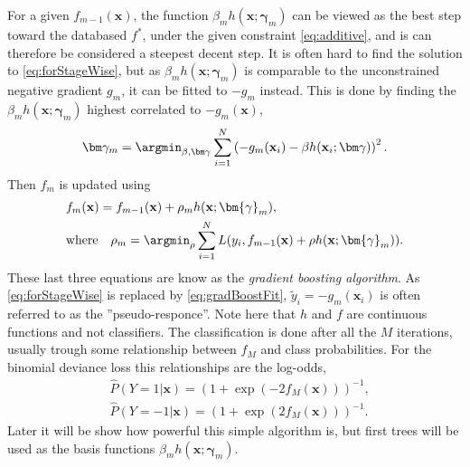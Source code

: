 For a given $f_{m-1}(\mathbf{x})$, the function $\beta_m h(\mathbf{x}; \bm{\gamma}_m)$ can be viewed as the best step toward the databased $f^*$, under the given constraint \eqref{eq:additive}, and is can therefore be considered a steepest decent step. It is often hard to find the solution to \eqref{eq:forStageWise}, but as $\beta_m h(\mathbf{x}; \bm{\gamma}_m)$ is comparable to the unconstrained negative gradient $g_m$, it can be fitted to $-g_m$ instead. This is done by finding the $\beta_m h(\mathbf{x}; \bm{\gamma}_m)$ highest correlated to $-g_m(\mathbf{x})$,
\begin{align}
  \label{eq:gradBoostFit} 
  \bm \gamma_m = \argmin_{\beta, \bm \gamma} \sum^{N}_{i=1} \left( -g_m(\mathbf{x}_i) - \beta h(\mathbf{x}_i; \bm \gamma) \right)^2.
\end{align}
Then $f_m$ is updated using
\begin{align}
  &f_m(\mathbf{x}) = f_{m-1}(\mathbf{x}) + \rho_m h(\mathbf{x}; \bm{\gamma}_{m}),\\
  \label{eq:lineSearch} 
  &\text{where} \quad \rho_m = \argmin_\rho \sum^{N}_{i=1} L(y_i, f_{m-1}(\mathbf{x}) + \rho h(\mathbf{x}; \bm{\gamma}_m)).
\end{align}
These last three equations are know as the \textit{gradient boosting algorithm}.
As \eqref{eq:forStageWise} is replaced by \eqref{eq:gradBoostFit}, $\tilde{y}_i = -g_m(\mathbf{x}_i)$ is often referred to as the ''pseudo-responce''. 
Note here that $h$ and $f$ are continuous functions and not classifiers. The classification is done after all the $M$ iterations, usually trough some relationship between $f_M$ and class probabilities. For the binomial deviance loss this relationships are the log-odds,
\begin{align}
  \label{eq:boostLogOdds1} 
  &\hat P(Y = 1 |  \mathbf{x}) = \left( 1+ \exp\left( -2 f_M (\mathbf{x}) \right) \right)^{-1},\\
  \label{eq:boostLogOdds2} 
  &\hat P(Y = -1 |  \mathbf{x}) = \left( 1+ \exp\left( 2 f_M (\mathbf{x}) \right) \right)^{-1}.
\end{align}
Later it will be show how powerful this simple algorithm is, but first trees will be used as the basis functions $\beta_m h(\mathbf{x}; \bm{\gamma}_m)$.

